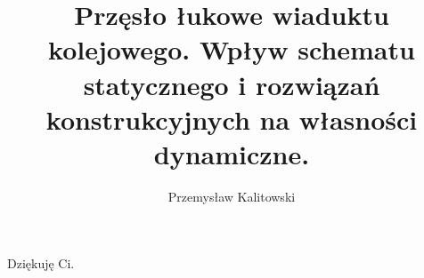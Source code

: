 
\title{Przęsło łukowe wiaduktu kolejowego. Wpływ schematu statycznego i rozwiązań konstrukcyjnych na własności dynamiczne.}
\author{Przemysław Kalitowski}



\begin{sloppypar}
\frontmatter

\myemptypage



\myemptypage





\thispagestyle{empty}
\vspace*{20cm}
\hfill Dziękuję Ci.
\vfill
\pagebreak[4]


\myemptypage


\tableofcontents
\newpage






\mainmatter




	





	





\printbibliography[heading=bibintoc]
\end{sloppypar}
